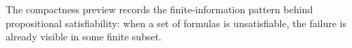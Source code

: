 \begin{remark*}[Exposition]
The compactness preview records the finite-information pattern behind
propositional satisfiability: when a set of formulas is unsatisfiable, the
failure is already visible in some finite subset.
\end{remark*}

\label{sec:propositional-compactness-preview}
